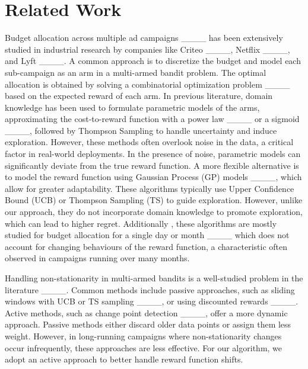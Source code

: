 \section{Related Work}
\label{relatedwork}
Budget allocation across multiple ad campaigns ____ has been extensively studied in industrial research by companies like Criteo ____, Netflix ____, and Lyft ____. A common approach is to discretize the budget and model each sub-campaign as an arm in a multi-armed bandit problem. The optimal allocation is obtained by solving a combinatorial optimization problem ____  based on the expected reward of each arm. In previous literature, domain knowledge has been used to formulate parametric models of the arms, approximating the cost-to-reward function with a power law ____ or a sigmoid ____, followed by Thompson Sampling to handle uncertainty and induce exploration. However, these methods often overlook noise in the data, a critical factor in real-world deployments. In the presence of noise, parametric models can significantly deviate from the true reward function. A more flexible alternative is to model the reward function using Gaussian Process (GP) models ____, which allow for greater adaptability. These algorithms typically use Upper Confidence Bound (UCB) or Thompson Sampling (TS) to guide exploration. However, unlike our approach, they do not incorporate domain knowledge to promote exploration, which can lead to higher regret. Additionally , these algorithms are mostly studied for budget allocation for a single day or month ____ which does not account for changing behaviours of the reward function, a characteristic often observed in campaigns running over many months.

Handling non-stationarity in multi-armed bandits is a well-studied problem in the literature ____. Common methods include passive approaches, such as sliding windows with UCB or TS sampling ____, or using discounted rewards ____. Active methods, such as change point detection ____, offer a more dynamic approach. Passive methods either discard older data points or assign them less weight. However, in long-running campaigns where non-stationarity changes occur infrequently, these approaches are less effective. For our algorithm, we adopt an active approach to better handle reward function shifts.